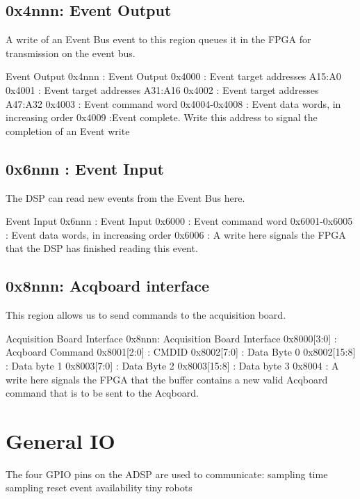 \subsection{0x4nnn: Event Output} 
A write of an Event Bus event to this region queues it in the FPGA for
transmission on the event bus.

\begin{memmap}{Event Output}
0x4nnn : Event Output
0x4000 : Event target addresses A15:A0
0x4001 : Event target addresses A31:A16 
0x4002 : Event target addresses A47:A32
0x4003 : Event command word
0x4004-0x4008 : Event data words, in increasing order
0x4009 :Event complete. Write this address to signal the completion of an Event write
\end{memmap}

\subsection{0x6nnn : Event Input}
The DSP can read new events from the Event Bus here. 

\begin{memmap}{Event Input}
0x6nnn : Event Input
0x6000 : Event command word
0x6001-0x6005 :  Event data words, in increasing order
0x6006 : A write here signals the FPGA that the DSP has finished reading this event.
\end{memmap}

\subsection{0x8nnn: Acqboard interface}
This region allows us to send commands to the acquisition board. 

\begin{memmap}{Acquisition Board Interface}
0x8nnn: Acquisition Board Interface
0x8000[3:0] : Acqboard Command 
0x8001[2:0] : CMDID 
0x8002[7:0] : Data Byte 0 
0x8002[15:8] : Data byte 1 
0x8003[7:0] : Data Byte 2 
0x8003[15:8] : Data byte 3 
0x8004 : A write here signals the FPGA that the buffer contains a new valid Acqboard command that is to be sent to the Acqboard.
\end{memmap}

\section{General IO}

The four GPIO pins on the ADSP are used to communicate:
sampling time
sampling reset
event availability
tiny robots

